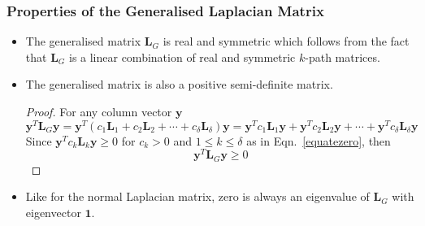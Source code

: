 \documentclass[10pt,a4paper]{article}
\begin{document}
		    \subsubsection{Properties of the Generalised Laplacian Matrix }
		    \begin{itemize}
		    \item The generalised matrix $\mathbf{L}_G$ is real and symmetric which follows from the fact that $\mathbf{L}_G$ is a linear combination of real and symmetric $k$-path matrices. 
		    
		    \item The generalised matrix is also a positive semi-definite matrix. 
		    \begin{proof}
		    	For any column vector $\mathbf{y}$
		    	\begin{equation}
		    	\mathbf{y}^T \mathbf{L}_{G} \mathbf{y} = \mathbf{y}^T(c_{1}\mathbf{L}_{1} + c_{2}\mathbf{L}_{2} + \cdots + c_{\delta}\mathbf{L}_{\delta} )\mathbf{y}
		    	= \mathbf{y}^Tc_{1}\mathbf{L}_{1}\mathbf{y} + \mathbf{y}^Tc_{2}\mathbf{L}_{2}\mathbf{y} + \cdots + \mathbf{y}^Tc_{\delta}\mathbf{L}_{\delta}\mathbf{y} 
		    	\end{equation}
		    	Since $\mathbf{y}^Tc_{k}\mathbf{L}_{k}\mathbf{y} \geq 0$ for $c_{k}>0$ and $1 \leq k \leq \delta$ as in Eqn.~\ref{equatezero}, then
		    	\begin{equation}
		    	\mathbf{y}^T \mathbf{L}_{G} \mathbf{y} \geq 0	
		    	\end{equation}
		    \end{proof}
	        \item Like for the normal Laplacian matrix, zero is always an eigenvalue of $\mathbf{L}_G$ with eigenvector $\mathbf{1}$.
	    
	       \end{itemize}
\end{document}
